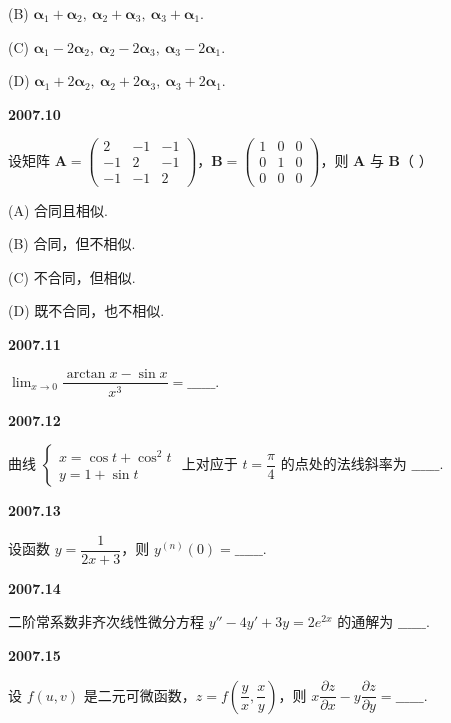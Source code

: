 \documentclass[UTF8,12pt,fontset=windows]{ctexart}
\begin{document}
(B) $\boldsymbol{\alpha}_1+\boldsymbol{\alpha}_2,\ \boldsymbol{\alpha}_2+\boldsymbol{\alpha}_3,\ \boldsymbol{\alpha}_3+\boldsymbol{\alpha}_1$.

(C) $\boldsymbol{\alpha}_1-2\boldsymbol{\alpha}_2,\ \boldsymbol{\alpha}_2-2\boldsymbol{\alpha}_3,\ \boldsymbol{\alpha}_3-2\boldsymbol{\alpha}_1$.

(D) $\boldsymbol{\alpha}_1+2\boldsymbol{\alpha}_2,\ \boldsymbol{\alpha}_2+2\boldsymbol{\alpha}_3,\ \boldsymbol{\alpha}_3+2\boldsymbol{\alpha}_1$.

\vfill
\newpage
{\large\bfseries 2007.10}

设矩阵 $\boldsymbol{A} = \begin{pmatrix} 2 & -1 & -1 \\ -1 & 2 & -1 \\ -1 & -1 & 2 \end{pmatrix}$，$\boldsymbol{B} = \begin{pmatrix} 1 & 0 & 0 \\ 0 & 1 & 0 \\ 0 & 0 & 0 \end{pmatrix}$，则 $\boldsymbol{A}$ 与 $\boldsymbol{B}$（ ）

(A) 合同且相似.

(B) 合同，但不相似.

(C) 不合同，但相似.

(D) 既不合同，也不相似.

\vfill
\newpage
{\large\bfseries 2007.11}

$\lim_{x \to 0}\dfrac{\arctan x - \sin x}{x^3} = \_\_\_\_\_\_.$

\vfill
\newpage
{\large\bfseries 2007.12}

曲线 $\begin{cases} x = \cos t + \cos^2 t \\ y = 1 + \sin t \end{cases}$ 上对应于 $t = \dfrac{\pi}{4}$ 的点处的法线斜率为 $\_\_\_\_\_\_.$

\vfill
\newpage
{\large\bfseries 2007.13}

设函数 $y = \dfrac{1}{2x+3}$，则 $y^{(n)}(0) = \_\_\_\_\_\_.$

\vfill
\newpage
{\large\bfseries 2007.14}

二阶常系数非齐次线性微分方程 $y'' - 4y' + 3y = 2e^{2x}$ 的通解为 $\_\_\_\_\_\_.$

\vfill
\newpage
{\large\bfseries 2007.15}

设 $f(u,v)$ 是二元可微函数，$z = f\left(\dfrac{y}{x}, \dfrac{x}{y}\right)$，则 $x\dfrac{\partial z}{\partial x} - y\dfrac{\partial z}{\partial y} = \_\_\_\_\_\_.$
\end{document}
